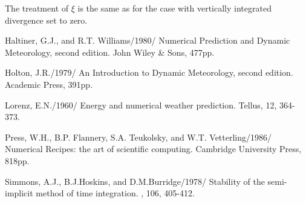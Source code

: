 The treatment of $\xi$ is the same as for the case with vertically integrated
divergence set to zero.
 
 
\vfill\eject
 
\References
 
\bref Haltiner, G.J., and R.T. Williams/1980/ Numerical Prediction and Dynamic
Meteorology, {\rm second edition}. John Wiley \& Sons, 477pp.
 
\bref Holton, J.R./1979/ An Introduction to Dynamic Meteorology, {\rm second
edition}. Academic Press, 391pp.
 
\pref Lorenz, E.N./1960/ Energy and numerical weather prediction. Tellus, 12,
364-373.
 
\bref Press, W.H., B.P. Flannery, S.A. Teukolsky, and W.T. Vetterling/1986/
Numerical Recipes: the art of scientific computing. Cambridge University
Press, 818pp.
 
\pref Simmons, A.J., B.J.Hoskins, and D.M.Burridge/1978/ Stability of the
semi-implicit method of time integration. \MWR, 106, 405-412.
 
\bye
 
